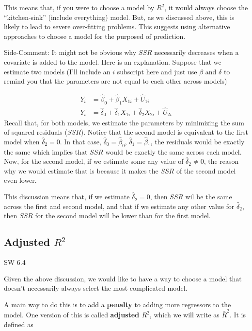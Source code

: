 \documentclass[
  letterpaper,
  DIV=11,
  numbers=noendperiod]{scrreprt}
\begin{document}
This means that, if you were to choose a model by \(R^2\), it would
always choose the ``kitchen-sink'' (include everything) model. But, as
we discussed above, this is likely to lead to severe over-fitting
problems. This suggests using alternative approaches to choose a model
for the purposed of prediction.

{Side-Comment:} It might not be obvious why \(SSR\) necessarily
decreases when a covariate is added to the model. Here is an
explanation. Suppose that we estimate two models (I'll include an \(i\)
subscript here and just use \(\beta\) and \(\delta\) to remind you that
the parameters are not equal to each other across models)

\[
  \begin{aligned}
  Y_i &= \hat{\beta}_0 + \hat{\beta}_1 X_{1i} + \hat{U}_{1i} \\
  Y_i &= \hat{\delta}_0 + \hat{\delta}_1 X_{1i} + \hat{\delta}_2 X_{2i} + \hat{U}_{2i}
  \end{aligned}
\] Recall that, for both models, we estimate the parameters by
minimizing the sum of squared residuals (\(SSR\)). Notice that the
second model is equivalent to the first model when \(\hat{\delta}_2=0\).
In that case, \(\hat{\delta}_0 = \hat{\beta}_0\),
\(\hat{\delta}_1 = \hat{\beta}_1\), the residuals would be exactly the
same which implies that \(SSR\) would be exactly the same across each
model. Now, for the second model, if we estimate some any value of
\(\hat{\delta}_2 \neq 0\), the reason why we would estimate that is
because it makes the \(SSR\) of the second model even lower.

This discussion means that, if we estimate \(\hat{\delta}_2=0\), then
\(SSR\) wil be the same across the first and second model, and that if
we estimate any other value for \(\hat{\delta}_2\), then \(SSR\) for the
second model will be lower than for the first model.

\subsection{\texorpdfstring{Adjusted
\(R^2\)}{Adjusted R\^{}2}}\label{adjusted-r2}

SW 6.4

Given the above discussion, we would like to have a way to choose a
model that doesn't necessarily always select the most complicated model.

A main way to do this is to add a \textbf{penalty} to adding more
regressors to the model. One version of this is called \textbf{adjusted
\(R^2\)}, which we will write as \(\bar{R}^2\). It is defined as
\end{document}
